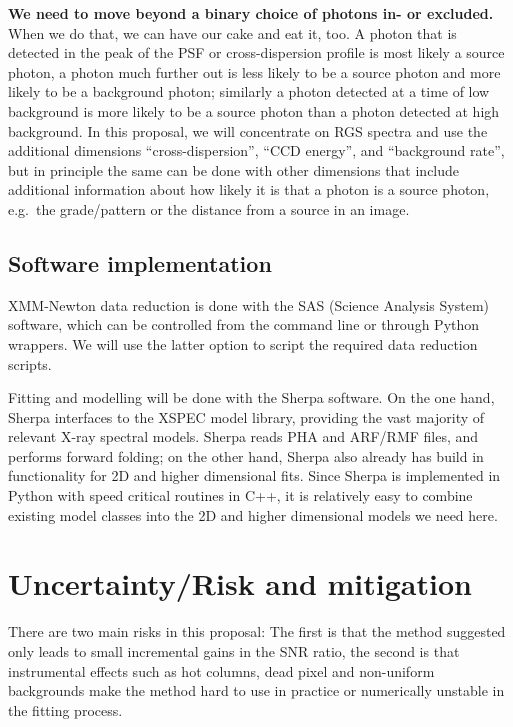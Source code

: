 \documentclass[fleqn,12pt,onecolumn]{SelfArx} %
\begin{document}
\textbf{We need to move beyond a binary choice of photons in- or excluded.} When we do that, we can have our cake and eat it, too. A photon that is detected in the peak of the PSF or cross-dispersion profile is most likely a source photon, a photon much further out is less likely to be a source photon and more likely to be a background photon; similarly a photon detected at a time of low background is more likely to be a source photon than a photon detected at high background. In this proposal, we will concentrate on RGS spectra and use the additional dimensions ``cross-dispersion'', ``CCD energy'', and ``background rate'', but in principle the same can be done with other dimensions that include additional information about how likely it is that a photon is a source photon, e.g.\ the grade/pattern or the distance from a source in an image.


\subsection{Software implementation}
XMM-Newton data reduction is done with the SAS (Science Analysis System) software, which can be controlled from the command line or through Python wrappers. We will use the latter option to script the required data reduction scripts.

Fitting and modelling will be done with the Sherpa \cite{2001SPIE.4477...76F} software. On the one hand, Sherpa interfaces to the XSPEC model library, providing the vast majority of relevant X-ray spectral models. Sherpa reads PHA and ARF/RMF files, and performs forward folding; on the other hand, Sherpa also already has build in functionality for 2D and higher dimensional fits. Since Sherpa is implemented in Python with speed critical routines in C++, it is relatively easy to combine existing model classes into the 2D and higher dimensional models we need here.


\section{Uncertainty/Risk and mitigation}
\label{sect:risk}
There are two main risks in this proposal: The first is that the method suggested only leads to small incremental gains in the SNR ratio, the second is that instrumental effects such as hot columns, dead pixel and non-uniform backgrounds make the method hard to use in practice or numerically unstable in the fitting process.
\end{document}
